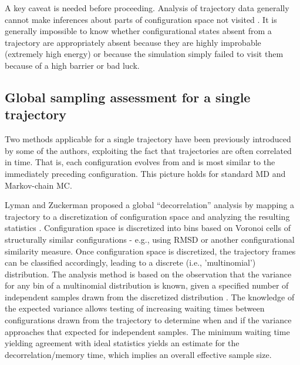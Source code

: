 A key caveat is needed before proceeding.
Analysis of trajectory data generally cannot make inferences about parts of configuration space not visited \cite{Grossfield2009}.
It is generally impossible to know whether configurational states absent from a trajectory are appropriately absent because they are highly improbable (extremely high energy) or because the simulation simply failed to visit them because of a high barrier or bad luck.

\subsection{Global sampling assessment for a single trajectory}
Two methods applicable for a single trajectory have been previously introduced by some of the authors, exploiting the fact that trajectories are often correlated in time.
That is, each configuration evolves from and is most similar to the immediately preceding configuration.
This picture holds for standard MD and Markov-chain MC.

Lyman and Zuckerman proposed a global ``decorrelation'' analysis by mapping a trajectory to a discretization of configuration space and analyzing the resulting statistics \cite{Lyman2007a}.  
Configuration space is discretized into bins based on Voronoi cells of structurally similar configurations - e.g., using RMSD or another configurational similarity measure.
Once configuration space is discretized, the trajectory frames can be classified accordingly, leading to a discrete (i.e., 'multinomial') distribution.
The analysis method is based on the observation that the variance for any bin of a multinomial distribution is known, given a specified number of independent samples drawn from the discretized distribution \cite{Lyman2007a}.
The knowledge of the expected variance allows testing of increasing waiting times between configurations drawn from the trajectory to determine when and if the variance approaches that expected for independent samples.
The minimum waiting time yielding agreement with ideal statistics yields an estimate for the decorrelation/memory time, which implies an overall effective sample size. %



